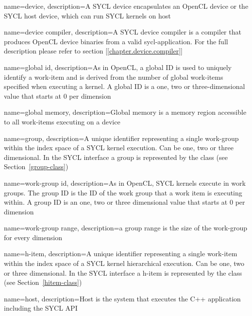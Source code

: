 {
  name=device,
  description={A SYCL device encapsulates an OpenCL device or the SYCL
               host device, which can run SYCL kernels on host}
}

{
  name={device compiler},
  description={A SYCL device compiler is a compiler that produces OpenCL
               \gls{device} binaries from a valid \gls{sycl-application}.
               For the full description please refer to section
         [\ref{chapter.device.compiler}]}
}

{
  name={global id},
  description={As in OpenCL, a global ID is used to uniquely identify a
               \gls{work-item} and is derived from the number of
               global \glspl{work-item}
               specified when executing a kernel. A global ID is a one, two or
               three-dimensional value that starts at 0 per dimension}
}

{
  name={global memory},
  description={Global memory is a memory region accessible to all \glspl{work-item}
               executing on a \gls{device}}
}

{
  name={group},
  description={A unique identifier representing a single \gls{work-group}
  within the index space of a SYCL kernel execution. Can be one, two or three
  dimensional. In the SYCL interface a \gls{group} is represented by the
   class (see Section~\ref{group-class})}
}

{
  name={work-group id},
  description={As in OpenCL, SYCL kernels execute in work groups. The group
               ID is the ID of the work group that a work item is executing within.
               A group ID is an one, two or three dimensional value that starts
               at 0 per dimension}
}

{
  name={work-group range},
  description={a group range is the size of the work-group for every dimension}
}

{
  name={h-item},
  description={A unique identifier representing a single \gls{work-item} within
  the index space of a SYCL kernel hierarchical execution. Can be one, two or
  three dimensional. In the SYCL interface a \gls{h-item} is represented by the
   class (see Section~\ref{hitem-class})}
}

{
  name=host,
  description={Host is the system that executes the C++ application including
               the SYCL API}
}

